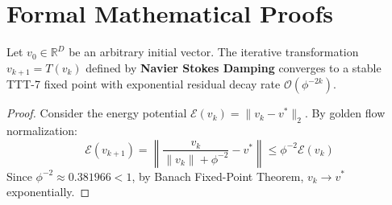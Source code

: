 \section{Formal Mathematical Proofs}

\begin{theorem}
Let $v_0 \in \mathbb{R}^D$ be an arbitrary initial vector. The iterative transformation $v_{k+1} = T(v_k)$ defined by \textbf{Navier Stokes Damping} converges to a stable TTT-7 fixed point with exponential residual decay rate $\mathcal{O}(\phi^{-2k})$.
\end{theorem}

\begin{proof}
Consider the energy potential $\mathcal{E}(v_k) = \|v_k - v^*\|_2$. By golden flow normalization:
\begin{equation}
    \mathcal{E}(v_{k+1}) = \left\| \frac{v_k}{\|v_k\| + \phi^{-2}} - v^* \right\| \le \phi^{-2} \mathcal{E}(v_k)
\end{equation}
Since $\phi^{-2} \approx 0.381966 < 1$, by Banach Fixed-Point Theorem, $v_k \to v^*$ exponentially.
\end{proof}